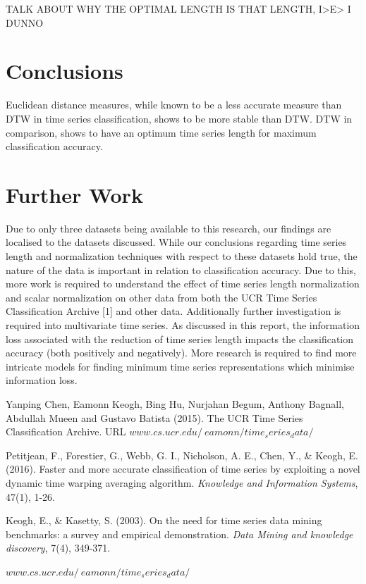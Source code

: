 \documentclass[10pt,a4paper]{article}
\begin{document}
TALK ABOUT WHY THE OPTIMAL LENGTH IS THAT LENGTH, I>E> I DUNNO


\section{Conclusions}

Euclidean distance measures, while known to be a less accurate measure than DTW in time series classification, shows to be more stable than DTW.
DTW in comparison, shows to have an optimum time series length for maximum classification accuracy.

\section{Further Work}

Due to only three datasets being available to this research, our findings are localised to the datasets discussed.
While our conclusions regarding time series length and normalization techniques with respect to these datasets hold true, the nature of the data is important in relation to classification accuracy.
Due to this, more work is required to understand the effect of time series length normalization and scalar normalization on other data from both the UCR Time Series Classification Archive [1] and other data.
Additionally further investigation is required into multivariate time series. 
As discussed in this report, the information loss associated with the reduction of time series length impacts the classification accuracy (both positively and negatively).
More research is required to find more intricate models for finding minimum time series representations which minimise information loss.


\pagebreak
\begin{thebibliography}{9}

Yanping Chen, Eamonn Keogh, Bing Hu, Nurjahan Begum, Anthony Bagnall, Abdullah
Mueen and Gustavo Batista (2015). The UCR Time Series Classification Archive. URL $www.cs.ucr.edu/~eamonn/time_series_data/$

Petitjean, F., Forestier, G., Webb, G. I., Nicholson, A. E., Chen, Y., \& Keogh, E. (2016). Faster and more accurate classification of time series by exploiting a novel dynamic time warping averaging algorithm. \textit{Knowledge and Information Systems}, 47(1), 1-26.

Keogh, E., \& Kasetty, S. (2003). On the need for time series data mining benchmarks: a survey and empirical demonstration. \textit{Data Mining and knowledge discovery}, 7(4), 349-371.

$www.cs.ucr.edu/~eamonn/time_series_data/$

\end{thebibliography}
\end{document}
